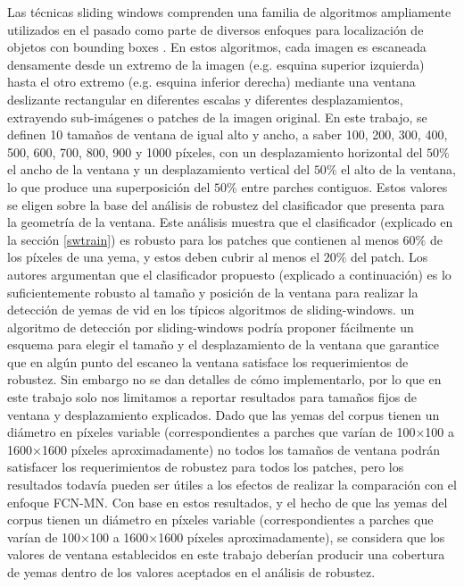 \documentclass[a4paper,authoryear,review]{elsarticle}
\begin{document}
Las técnicas sliding windows comprenden una familia de algoritmos ampliamente utilizados en el pasado como parte de diversos enfoques para localización de objetos con bounding boxes \cite{divvala2009empirical, wang2009hog, chum2007exemplar, ferrari2007groups, dalal2005histograms, rowley1996human}. En estos algoritmos, cada imagen es escaneada densamente desde un extremo de la imagen (e.g. esquina superior izquierda) hasta el otro extremo (e.g. esquina inferior derecha) mediante una ventana deslizante rectangular en diferentes escalas y diferentes desplazamientos, extrayendo sub-imágenes o patches de la imagen original. En este trabajo, se definen 10 tamaños de ventana de igual alto y ancho, a saber 100, 200, 300, 400, 500, 600, 700, 800, 900 y 1000 píxeles, con un desplazamiento horizontal del $50\%$ el ancho de la ventana y un desplazamiento vertical del $50\%$ el alto de la ventana, lo que produce una superposición del $50\%$ entre parches contiguos. Estos valores se eligen sobre la base del análisis de robustez del clasificador que presenta \citet{perez2017image} para la geometría de la ventana. Este análisis muestra que el clasificador (explicado en la sección \ref{swtrain}) es robusto para los patches que contienen al menos $60\%$ de los píxeles de una yema, y estos deben cubrir al menos el $20\%$ del patch. Los autores argumentan que el clasificador propuesto (explicado a continuación) es lo suficientemente robusto al tamaño y posición de la ventana para realizar la detección de yemas de vid en los típicos algoritmos de sliding-windows. un algoritmo de detección por sliding-windows podría proponer fácilmente un esquema para elegir el tamaño y el desplazamiento de la ventana que garantice que en algún punto del escaneo la ventana satisface los requerimientos de robustez. Sin embargo no se dan detalles de cómo implementarlo, por lo que en este trabajo solo nos limitamos a reportar resultados para tamaños fijos de ventana y desplazamiento explicados. Dado que las yemas del corpus tienen un diámetro en píxeles variable (correspondientes a parches que varían de 100×100 a 1600×1600 píxeles aproximadamente) no todos los tamaños de ventana podrán satisfacer los requerimientos de robustez para todos los patches, pero los resultados todavía pueden ser útiles a los efectos de realizar la comparación con el enfoque FCN-MN. Con base en estos resultados, y el hecho de que las yemas del corpus tienen un diámetro en píxeles variable (correspondientes a parches que varían de 100×100 a 1600×1600 píxeles aproximadamente), se considera que los valores de ventana establecidos en este trabajo deberían producir una cobertura de yemas dentro de los valores aceptados en el análisis de robustez. 
\end{document}
